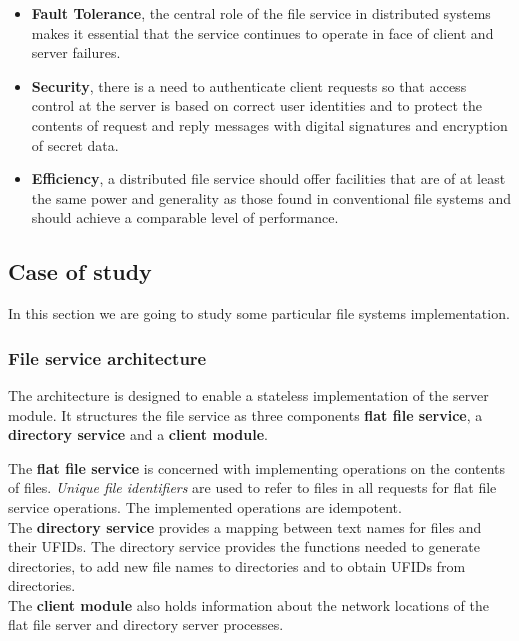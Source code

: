 \begin{itemize}
	\item \textbf{Fault Tolerance}, the central role of the file service in distributed systems makes it essential that the service continues to operate in face of client and server failures.
	
	\item \textbf{Security}, there is a need to authenticate client requests so that access control at the server is based on correct user identities and	to protect the contents of request and reply messages with digital signatures and encryption of secret data.
	
	\item \textbf{Efficiency}, a distributed file service should offer facilities that are of at least the same power and generality as those found in conventional file systems and should achieve a comparable level of performance.
\end{itemize}

\subsection{Case of study}
In this section we are going to study some particular file systems implementation.

\subsubsection{File service architecture}
The architecture is designed to enable a stateless implementation of the server module. It structures the file service as three components \textbf{flat file service}, a \textbf{directory service} and a \textbf{client module}.


The \textbf{flat file service} is concerned with implementing operations on the contents of files. \textit{Unique file identifiers} are used to refer to files in all requests for flat file service operations. The implemented operations are idempotent.\\
The \textbf{directory service} provides a mapping between text names for files and their UFIDs. The directory service provides the functions needed to generate directories, to add new file names to directories and to obtain UFIDs from directories.\\
The \textbf{client module} also holds information about the network locations of the flat file server and directory server processes.

